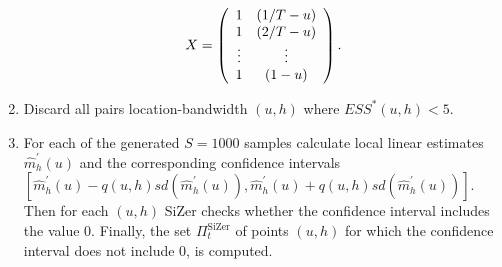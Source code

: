 \begin{enumerate}
\begin{equation}
			X =  \left( \begin{array}{c c}
   					1 & (1/T - u) \\
					1 & (2/T - u)  \\
					\vdots & \vdots \\
					1 & (1 - u)  \\
				   \end{array} \right). \nonumber
			\end{equation}
	\item\label{discarding} Discard all pairs location-bandwidth $(u, h)$ where $ESS^*(u, h) < 5$.
	\item For each of the generated $S = 1000$ samples calculate local linear estimates $\widehat{m}^\prime_h(u)$ and the corresponding confidence intervals $[\widehat{m}^\prime_h(u) - q(u,h)sd(\widehat{m}^\prime_h(u)),\widehat{m}^\prime_h(u) + q(u,h)sd(\widehat{m}^\prime_h(u))]$. Then for each $(u, h)$ SiZer checks whether the confidence interval includes the value $0$. Finally, the set $\Pi^{\text{SiZer}}_t$ of points $(u, h)$ for which the confidence interval does not include $0$, is computed.
\end{enumerate}